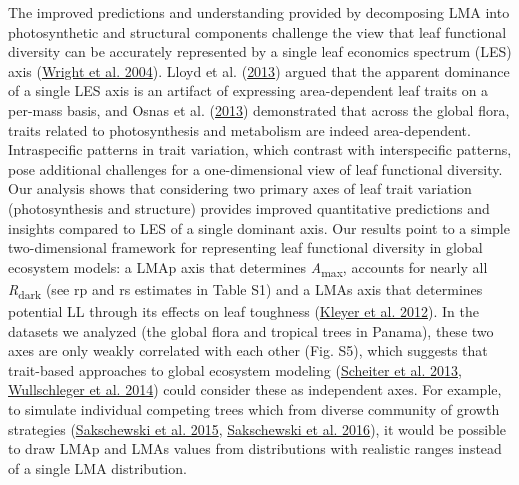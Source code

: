 \documentclass[
  12pt,
  a4paper,
,tablecaptionabove
]{scrartcl}
\begin{document}
The improved predictions and understanding provided by decomposing LMA into photosynthetic and structural components challenge the view that leaf functional diversity can be accurately represented by a single leaf economics spectrum (LES) axis (\protect\hyperlink{ref-Wright2004a}{Wright et al. 2004}).
Lloyd et al. (\protect\hyperlink{ref-Lloyd2013}{2013}) argued that the apparent dominance of a single LES axis is an artifact of expressing area-dependent leaf traits on a per-mass basis, and Osnas et al. (\protect\hyperlink{ref-Osnas2013}{2013}) demonstrated that across the global flora, traits related to photosynthesis and metabolism are indeed area-dependent.
Intraspecific patterns in trait variation, which contrast with interspecific patterns, pose additional challenges for a one-dimensional view of leaf functional diversity. Our analysis shows that considering two primary axes of leaf trait variation (photosynthesis and structure) provides improved quantitative predictions and insights compared to LES of a single dominant axis.
Our results point to a simple two-dimensional framework for representing leaf functional diversity in global ecosystem models: a LMAp axis that determines \emph{A}\textsubscript{max}, accounts for nearly all \emph{R}\textsubscript{dark} (see rp and rs estimates in Table S1) and a LMAs axis that determines potential LL through its effects on leaf toughness (\protect\hyperlink{ref-Kleyer2012}{Kleyer et al. 2012}).
In the datasets we analyzed (the global flora and tropical trees in Panama), these two axes are only weakly correlated with each other (Fig. S5), which suggests that trait-based approaches to global ecosystem modeling (\protect\hyperlink{ref-Scheiter2013}{Scheiter et al. 2013}, \protect\hyperlink{ref-Wullschleger2014}{Wullschleger et al. 2014}) could consider these as independent axes.
For example, to simulate individual competing trees which from diverse community of growth strategies (\protect\hyperlink{ref-Sakschewski2015}{Sakschewski et al. 2015}, \protect\hyperlink{ref-Sakschewski2016}{Sakschewski et al. 2016}), it would be possible to draw LMAp and LMAs values from distributions with realistic ranges instead of a single LMA distribution.
\end{document}
